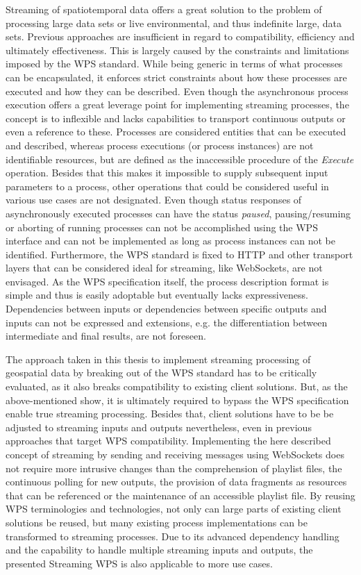 Streaming of spatiotemporal data offers a great solution to the problem of processing large data sets or live environmental, and thus indefinite large, data sets. Previous approaches are insufficient in regard to compatibility, efficiency and ultimately effectiveness. This is largely caused by the constraints and limitations imposed by the WPS standard. While being generic in terms of what processes can be encapsulated, it enforces strict constraints about how these processes are executed and how they can be described. Even though the asynchronous process execution offers a great leverage point for implementing streaming processes, the concept is to inflexible and lacks capabilities to transport continuous outputs or even a reference to these. Processes are considered entities that can be executed and described, whereas process executions (or process instances) are not identifiable resources, but are defined as the inaccessible procedure of the \emph{Execute} operation. Besides that this makes it impossible to supply subsequent input parameters to a process, other operations that could be considered useful in various use cases are not designated. Even though status responses of asynchronously executed processes can have the status \emph{paused}, pausing/resuming or aborting of running processes can not be accomplished using the WPS interface and can not be implemented as long as process instances can not be identified. Furthermore, the WPS standard is fixed to HTTP and other transport layers that can be considered ideal for streaming, like WebSockets, are not envisaged.
As the WPS specification itself, the process description format is simple and thus is easily adoptable but eventually lacks expressiveness. Dependencies between inputs or dependencies between specific outputs and inputs can not be expressed and extensions, e.g. the differentiation between intermediate and final results, are not foreseen.

The approach taken in this thesis to implement streaming processing of geospatial data by breaking out of the WPS standard has to be critically evaluated, as it also breaks compatibility to existing client solutions. But, as the above-mentioned show, it is ultimately required to bypass the WPS specification enable true streaming processing. Besides that, client solutions have to be be adjusted to streaming inputs and outputs nevertheless, even in previous approaches that target WPS compatibility. Implementing the here described concept of streaming by sending and receiving messages using WebSockets does not require more intrusive changes than the comprehension of playlist files, the continuous polling for new outputs, the provision of data fragments as resources that can be referenced or the maintenance of an accessible playlist file. By reusing WPS terminologies and technologies, not only can large parts of existing client solutions be reused, but many existing process implementations can be transformed to streaming processes. Due to its advanced dependency handling and the capability to handle multiple streaming inputs and outputs, the presented Streaming WPS is also applicable to more use cases.

